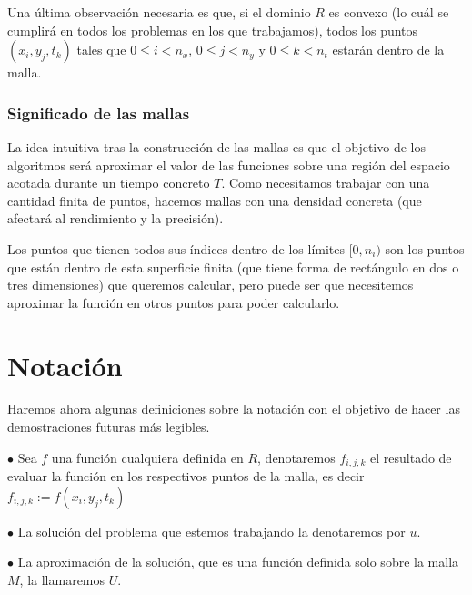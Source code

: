 Una última observación necesaria es que, si el dominio $R$ es convexo (lo cuál se cumplirá en todos los problemas en los que trabajamos), todos los puntos $(x_i,y_j,t_k)$ tales que $0\leq i<n_x$, $0\leq j<n_y$ y $0\leq k<n_t$ estarán dentro de la malla.

\subsubsection{Significado de las mallas}
La idea intuitiva tras la construcción de las mallas es que el objetivo de los algoritmos será aproximar el valor de las funciones sobre una región del espacio acotada durante un tiempo concreto $T$. Como necesitamos trabajar con una cantidad finita de puntos, hacemos mallas con una densidad concreta (que afectará al rendimiento y la precisión).

Los puntos que tienen todos sus índices dentro de los límites $[0,n_i)$ son los puntos que están dentro de esta superficie finita (que tiene forma de rectángulo en dos o tres dimensiones) que queremos calcular, pero puede ser que necesitemos aproximar la función en otros puntos para poder calcularlo.

\section{Notación}\label{sec:notacion}
Haremos ahora algunas definiciones sobre la notación con el objetivo de hacer las demostraciones futuras más legibles.

$\bullet$ Sea $f$ una función cualquiera definida en $R$, denotaremos $f_{i,j,k}$ el resultado de evaluar la función en los respectivos puntos de la malla, es decir $f_{i,j,k}:=f(x_i,y_j,t_k)$

$\bullet$ La solución del problema que estemos trabajando la denotaremos por $u$.

$\bullet$ La aproximación de la solución, que es una función definida solo sobre la malla $M$, la llamaremos $U$.



